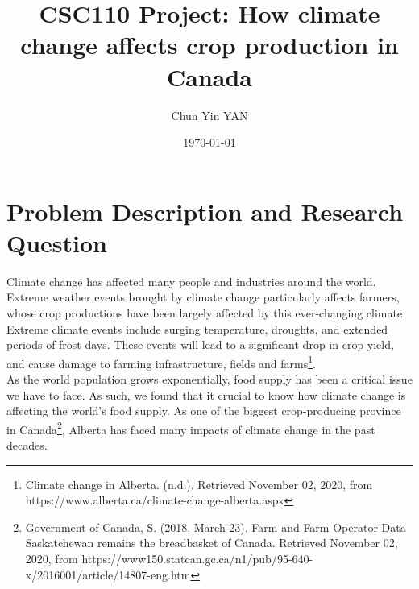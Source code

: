 \documentclass[fontsize=11pt]{article}
\title{CSC110 Project: How climate change affects crop production in Canada}
\author{Chun Yin YAN}
\date{\today}
\begin{document}
\maketitle

\section*{Problem Description and Research Question}

Climate change has affected many people and industries around the world. Extreme weather events brought by climate change particularly affects farmers, whose crop productions have been largely affected by this ever-changing climate.  Extreme climate events include surging temperature, droughts, and extended periods of frost days. These events will lead to a significant drop in crop yield, and cause damage to farming infrastructure, fields and farms\footnote{Climate change in Alberta. (n.d.). Retrieved November 02, 2020, from https://www.alberta.ca/climate-change-alberta.aspx}. \\

As the world population grows exponentially, food supply has been a critical issue we have to face. As such, we found that it crucial to know how climate change is affecting the world's food supply. As one of the biggest crop-producing province in Canada\footnote{Government of Canada, S. (2018, March 23). Farm and Farm Operator Data Saskatchewan remains the breadbasket of Canada. Retrieved November 02, 2020, from https://www150.statcan.gc.ca/n1/pub/95-640-x/2016001/article/14807-eng.htm}, Alberta has faced many impacts of climate change in the past decades. \\
\end{document}
